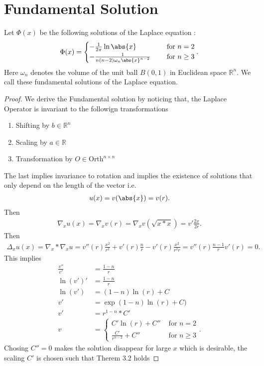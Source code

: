 \section{Fundamental Solution}
\begin{definition}
 Let $\Phi(x)$  be the following solutions of the Laplace equation : 
 \begin{align*}
  \Phi(x) = \begin{cases}
    -\frac{1}{2\pi }\ln \abs{x} \quad &\text{ for } n = 2\\
    -\frac{1}{n(n-2)\omega_n \abs{x}^{n-2}  }\quad &\text{ for } n \ge 3\\
  \end{cases}
 .\end{align*}
 Here $\omega_n$ denotes the volume of the unit ball $B(0,1)$ in Euclidean space $\mathbb{R}^{n} $. We call
 these fundamental solutions of the Laplace equation.
\end{definition}
\begin{proof}
 We derive the Fundamental solution by noticing that, the Laplace Operator is invariant to the followign transformations
 \begin{enumerate}
   \item Shifting by $b \in  \mathbb{R}^{n} $ 
   \item Scaling by $a \in \mathbb{R}$ 
   \item Transformation by $O \in  \text{Orth}^{n \times n} $
 \end{enumerate}
 The last implies invariance to rotation and implies the existence of solutions that only depend on the length of the vector i.e. 
 \begin{align*}
  u(x) = v(\abs{x}) = v(r)  
 .\end{align*}
 Then 
 \begin{align*}
  \nabla_x u(x) = \nabla_x v(r) = \nabla_x v(\sqrt{x*x} ) = v' \frac{2x}{2r} 
 .\end{align*}
 Then 
 \begin{align*}
   \Delta_x u(x) = \nabla_x * \nabla_x u = v''(r) \frac{x^2}{r^2} + v'(r) \frac{n}{r} - v'(r) \frac{x^2}{r^2r} = v''(r) \frac{n-1}{r}v'(r) =0
 .\end{align*}
 This implies 
 \begin{align*}
   \frac{v''}{v'} &= \frac{1-n}{r}\\
   \ln(v')' &=  \frac{1-n}{r} \\
   \ln(v') &= (1-n)\ln(r) + C \\
   v' &= \exp(1-n) \ln(r) + C)\\
   v' &= r^{1-n}*C' \\
   v &= \begin{cases}
     C'\ln(r) + C'' &\text{ for } n= 2 \\
     \frac{C'}{r^{n-2} } + C'' &\text{ for } n\ge  3
   \end{cases}
 .\end{align*}
 Chosing $C'' = 0$ makes the solution disappear for large $x$ which is desirable, 
 the scaling $C'$ is chosen such that Therem 3.2 holds
\end{proof}
